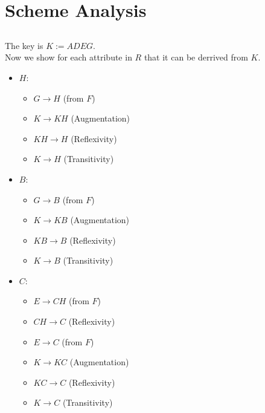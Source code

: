 \section{Scheme Analysis}
\subsection{}
The key is $K := ADEG$.\\
Now we show for each attribute in $R$ that it can be derrived from $K$.
\begin{itemize}
	\item $H$: 
	\begin{itemize}
		\item $G\rightarrow H$ (from $F$)
		\item $K\rightarrow KH$ (Augmentation)
		\item $KH\rightarrow H$ (Reflexivity)
		\item $K\rightarrow H$ (Transitivity)
	\end{itemize}
	\item $B$: 
	\begin{itemize}
		\item $G\rightarrow B$ (from $F$)
		\item $K\rightarrow KB$ (Augmentation)
		\item $KB\rightarrow B$ (Reflexivity)
		\item $K\rightarrow B$ (Transitivity)
	\end{itemize}
	\item $C$: 
	\begin{itemize}
		\item $E\rightarrow CH$ (from $F$)
		\item $CH\rightarrow C$ (Reflexivity)
		\item $E\rightarrow C$ (from $F$)
		\item $K\rightarrow KC$ (Augmentation)
		\item $KC\rightarrow C$ (Reflexivity)
		\item $K\rightarrow C$ (Transitivity)
	\end{itemize}
\end{itemize}

